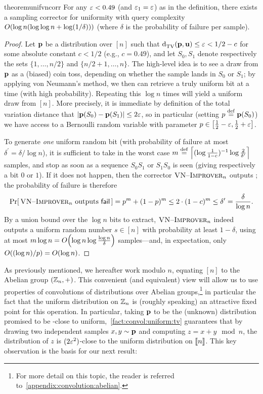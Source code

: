 \begin{restatable}{theorem}{unifvncorr}\label{lemma:sampling:corrector:uniformity:vneumann}
  For any $\varepsilon< 0.49$ (and $\varepsilon_1=\varepsilon$) as in the definition, there exists a sampling corrector for uniformity with query complexity $\bigO{\log n(\log\log n + \log(1/\delta))}$ (where $\delta$ is the probability of failure per sample).
\end{restatable}
\begin{proof}
Let $\mathbf{p}$ be a distribution over $[n]$ such that ${\operatorname{d}_{\rm{TV}}^{}\!\left({\mathbf{p}, \mathbf{u}}\right)}\leq \varepsilon < 1/2 - c$ for some absolute constant {$c < 1/2$ (e.g., $c=0.49$)}, and let $S_0, S_1$ denote respectively the sets $\{1,\dots,n/2\}$ and $\{n/2+1,\dots,n\}$. The high-level idea is to see a draw from $\mathbf{p}$ as a (biased) coin toss, depending on whether the sample lands in $S_0$ or $S_1$; by applying von Neumann's method, we then can retrieve a truly uniform bit at a time (with high probability). Repeating this $\log n$ times will yield a uniform draw from $[n]$. More precisely, it is immediate by definition of the total variation distance that $\left\lvert  \mathbf{p}(S_0)-\mathbf{p}(S_1)  \right\rvert \leq 2\varepsilon$, so in particular (setting $p\stackrel{\rm def}{=} \mathbf{p}(S_0)$) we have access to a Bernoulli random variable with parameter $p\in\left[\frac{1}{2}-\varepsilon,\frac{1}{2}+\varepsilon\right]$.

To generate \emph{one} uniform random bit (with probability of failure at most $\delta^\prime=\delta/\log n$), it is sufficient to take in the worst case $m\stackrel{\rm def}{=} \left\lceil (\log\frac{1}{1-c})^{-1}\log\frac{2}{\delta^\prime} \right\rceil$ samples, and stop as soon as a sequence $S_0S_1$ or $S_1S_0$ is seen (giving respectively a bit $0$ or $1$). If it does not happen, then the corrector $\textsc{VN--Improver}_n$ outputs \fail; the probability of failure is therefore
\[
   \Pr\!\left[\, \textsc{VN--Improver}_n\text{ outputs }\textsf{fail}\, \right] = p^{m} + (1-p)^m \leq 2\cdot (1-c)^m \leq \delta^\prime = \frac{\delta}{\log n}.
\]
By a union bound over the $\log n$ bits to extract, $\textsc{VN--Improver}_n$ indeed outputs a uniform random number $s\in[n]$ with probability at least $1-\delta$, using at most $m\log n = \bigO{\log n \log\frac{\log n}{\delta}}$ samples---and, in expectation, only $\bigO{(\log n)/{p}} = \bigO{\log n}$.
\end{proof}
As previously mentioned, we hereafter work modulo $n$, equating $[n]$ to the Abelian group $(\mathbb{Z}_n,+)$. This convenient (and equivalent) view will allow us to use properties of convolutions of distributions over Abelian groups,\footnote{For more detail on this topic, the reader is referred to~\cref{appendix:convolution:abelian}.} in particular the fact that the uniform distribution on $\mathbb{Z}_n$ is (roughly speaking) an attractive fixed point for this operation. In particular, taking $\mathbf{p}$ to be the (unknown) distribution promised to be \eps-close to uniform,~\cref{fact:convol:uniform:tv} guarantees that by drawing two independent samples $x,y\sim \mathbf{p}$ and computing $z=x+y \mod n$, the distribution of $z$ is $(2\varepsilon^2)$-close to the uniform distribution on $\llbracket n\rrbracket$. This key observation is the basis for our next result:
